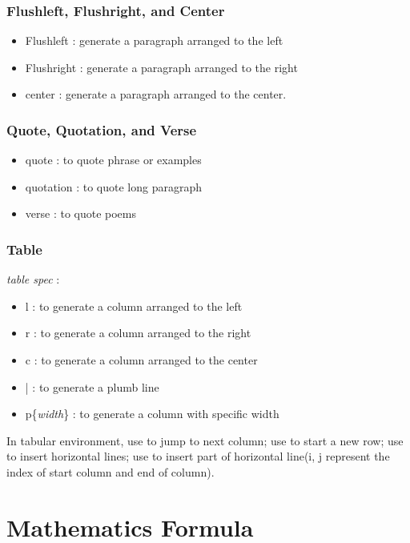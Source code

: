 \documentclass{article}
\begin{document}
\subsubsection{Flushleft, Flushright, and Center}
\begin{itemize}
    \item Flushleft : generate a paragraph arranged to the left
    \item Flushright :  generate a paragraph arranged to the right
    \item center : generate a paragraph arranged to the center.
\end{itemize}

\subsubsection{Quote, Quotation, and Verse}
\begin{itemize}
    \item quote : to quote phrase or examples
    \item quotation : to quote long paragraph
    \item verse : to quote poems 
\end{itemize}

\subsubsection{Table}
\emph{table spec}{} : \\
\begin{itemize}
    \item l : to generate a column arranged to the left
    \item r : to generate a column arranged to the right
    \item c : to generate a column arranged to the center
    \item | : to generate a plumb line
    \item p\{\emph{width}\}{} : to generate a column with specific width
\end{itemize}
In tabular environment, use \framebox{\&} to jump to next column; use
\framebox{$\backslash\backslash$} to start a new row; use  to insert horizontal lines;
use  to insert part of horizontal line(i, j represent
the index of start column and end of column).

\section{Mathematics Formula}
\end{document}
